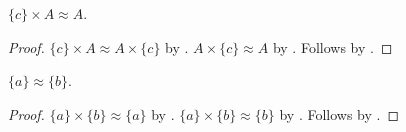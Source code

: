 \begin{corollary}\label{times_singleton_left_equinum}
    $\{c\}\times A\approx A$.
\end{corollary}
\begin{proof}
    $\{c\}\times A\approx A\times\{c\}$
        by .
    $A\times\{c\}\approx A$ by .
    Follows by .
\end{proof}

\begin{proposition}\label{singletons_equinum}
    $\{a\}\approx\{b\}$.
\end{proposition}
\begin{proof}
    $\{a\}\times\{b\}\approx\{a\}$
        by .
    $\{a\}\times\{b\}\approx\{b\}$
        by .
    Follows by .
\end{proof}
